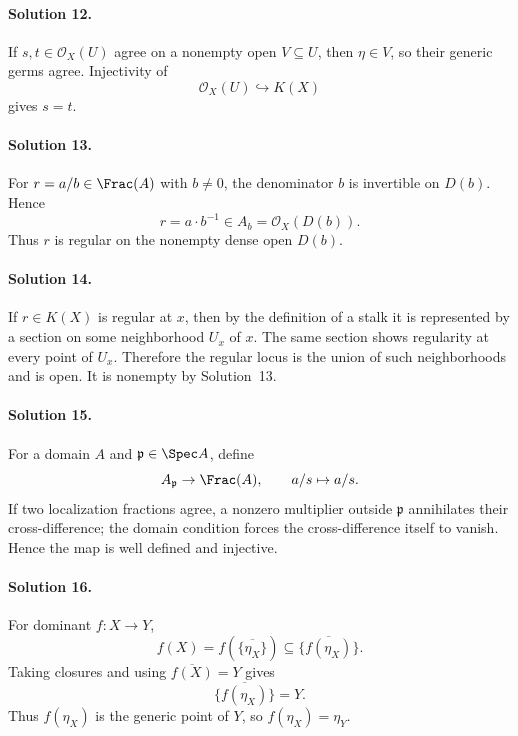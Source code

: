 \paragraph{Solution 12.}
If \(s,t\in\mathcal O_X(U)\) agree on a nonempty open \(V\subseteq U\), then \(\eta\in V\), so
their generic germs agree. Injectivity of
\[
\mathcal O_X(U)\hookrightarrow K(X)
\]
gives \(s=t\).

\paragraph{Solution 13.}
For \(r=a/b\in\Frac(A)\) with \(b\ne0\), the denominator \(b\) is invertible on
\(D(b)\). Hence
\[
r=a\cdot b^{-1}\in A_b=\mathcal O_X(D(b)).
\]
Thus \(r\) is regular on the nonempty dense open \(D(b)\).

\paragraph{Solution 14.}
If \(r\in K(X)\) is regular at \(x\), then by the definition of a stalk it is represented by a
section on some neighborhood \(U_x\) of \(x\). The same section shows regularity at every point of
\(U_x\). Therefore the regular locus is the union of such neighborhoods and is open. It is
nonempty by Solution~13.

\paragraph{Solution 15.}
For a domain \(A\) and \(\mathfrak p\in\Spec A\), define
\[
A_{\mathfrak p}\to\Frac(A),\qquad a/s\mapsto a/s.
\]
If two localization fractions agree, a nonzero multiplier outside \(\mathfrak p\) annihilates their
cross-difference; the domain condition forces the cross-difference itself to vanish. Hence the map
is well defined and injective.

\paragraph{Solution 16.}
For dominant \(f:X\to Y\),
\[
f(X)=f(\overline{\{\eta_X\}})\subseteq\overline{\{f(\eta_X)\}}.
\]
Taking closures and using \(\overline{f(X)}=Y\) gives
\[
\overline{\{f(\eta_X)\}}=Y.
\]
Thus \(f(\eta_X)\) is the generic point of \(Y\), so \(f(\eta_X)=\eta_Y\).

